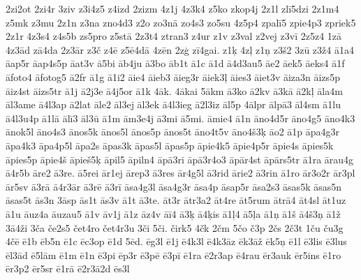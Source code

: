 {{2zi2ot 2zi4r 3ziv z3i4z5 z4izd 2zizm 4z1j 4z3k4 z5ko zkop4j 2z1l
zl\={i}5dzi 2z1m4 z5mk z3mu 2z1n z3na zno4d3 z2o zo3n\={a} zo4s3 zo5su
4z5p4 zpal\={i}5 zpie4p3 zpriek5 2z1r 4z3s4 z4s5b zs5pro z5st\={a}
2z3t4 ztran3 z4ur z1v z3val z2vej z3v\={i} 2z5z4 1z\={a} 4z3\={a}d
z\={a}4da 2z3\={a}r z3\v{c} z4\={e} z5\={e}4d\={a} 4z\={e}n
2z\c{g} z\={i}4gai. z1\c{k} 4z\c{l} z1\c{n} z3\v{s}2 3z\={u}
z3\v{z}4 \={a}1a4 \={a}ap5r \={a}ap4s5p \={a}at3v \={a}5bi
\={a}b4ju \={a}3bo \={a}b1t \={a}1c \={a}1d \={a}4d3au5 \={a}e2
\={a}ek5 \={a}eks4 \={a}1f \={a}foto4 \={a}fotog5 \={a}2fr
\={a}1g \={a}1i2 \={a}ie4 \={a}ieb3 \={a}ieg3r \={a}iek3\c{l}
\={a}ies3 \={a}iet3v \={a}iza3n \={a}izs5p \={a}iz4st
\={a}izs5tr \={a}1j \={a}2j3e \={a}4j5or \={a}1k 4\={a}k.
4\={a}kai 5\={a}km \={a}3ko \={a}2kv \={a}3k\={a} \={a}2k\c{l}
\={a}la4m \={a}l3ame \={a}4l3ap \={a}2lat \={a}le2 \={a}l3ej
\={a}l3ek \={a}4l3ieg \={a}2l3iz \={a}l5p 4\={a}lpr \={a}lp\={a}3
\={a}l4sm \={a}1lu \={a}4l3u4p \={a}1l\={a} \={a}l\={i}3
\={a}l3\={u} \={a}1m \={a}m3e4j \={a}3mi \={a}5mi. \={a}mie4
\={a}1n \={a}no4d5r \={a}no4g5 \={a}no4k3 \={a}nok5l \={a}no4s3
\={a}nos5k \={a}nos5l \={a}nos5p \={a}nos5t \={a}no4t5v
\={a}no4\v{s}3\c{k} \={a}o2 \={a}1p \={a}pa4g3r \={a}pa4k3
\={a}pa4p5l \={a}pa2s \={a}pas3k \={a}pas5l \={a}pas5p
\={a}pie4k5 \={a}pie4p5r \={a}pie4s \={a}pies5k \={a}pies5p
\={a}pie4\v{s} \={a}pie\v{s}5\c{k} \={a}pil5 \={a}piln4
\={a}p\={a}3ri \={a}p\={a}3r4o3 \={a}p\={a}r4st \={a}p\={a}rs5tr
\={a}1ra \={a}rau4g \={a}4r5b \={a}re2 \={a}3re.
\={a}5rei \={a}r1ej \={a}rep3 \={a}3res \={a}r4g5l \={a}3rid
\={a}rie2 \={a}3rin \={a}1ro \={a}r3o2r \={a}r3pl \={a}r5sv
\={a}3r\={a} \={a}4r3\={a}r \={a}3r\={e} \={a}3r\={i} \={a}sa4g3l
\={a}sa4g3r \={a}sa4p \={a}sap5r \={a}sa2s3 \={a}sas5k
\={a}sas5n \={a}sas5t \={a}s3n 3\={a}sp \={a}s1t \={a}s3v
\={a}1t \={a}3te. \={a}t3r \={a}tr3a2 \={a}t4re \={a}t5rum
\={a}tr\={a}4 \={a}t4sl \={a}t1uz \={a}1u \={a}uz4a \={a}uzau5
\={a}1v \={a}v1j \={a}1z \={a}z4v \={a}\={i}4 \={a}3\c{k}
\={a}4\c{k}is \={a}1\c{l}4 \={a}5\c{l}a \={a}1\c{n} \={a}1\v{s}
\={a}4\v{s}3\c{n} \={a}1\v{z} 3\={a}4\v{z}i 3\v{c}a \v{c}e2s5
\v{c}et4ro \v{c}et4r3u 3\v{c}i 5\v{c}i. \v{c}irk5 4\v{c}k
2\v{c}m 5\v{c}o \v{c}3p 2\v{c}s 2\v{c}3t 1\v{c}u \v{c}u3g 4\v{c}\={e}
\={e}1b \={e}b5n \={e}1c \={e}c3op \={e}1d 5\={e}d. \={e}g3l
\={e}1j \={e}4k3l \={e}4k3\={a}z \={e}k3\={a}\v{z} \={e}k5\c{n}
\={e}1l \={e}3lis \={e}3lus \={e}l3\={a}d \={e}5l\={a}m
\={e}1m \={e}1n \={e}3pi \={e}p3r \={e}3p\={e} \={e}3p\={i}
\={e}1ra \={e}2r3ap \={e}4rau \={e}r3auk \={e}r5ins \={e}1ro
\={e}r3p2 \={e}r5sr \={e}1r\={a} \={e}2r3\={a}2d \={e}s3l
}}
